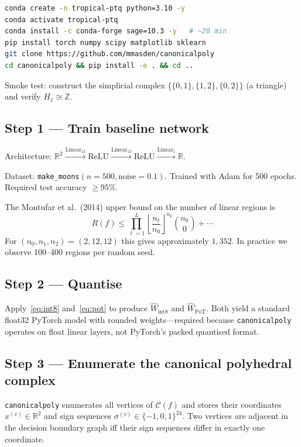 \documentclass[11pt]{article}
\newcommand{\R}{\mathbb{R}}
\newcommand{\Z}{\mathbb{Z}}
\newcommand{\C}{\mathcal{C}}
\begin{document}
\begin{lstlisting}[language=bash]
conda create -n tropical-ptq python=3.10 -y
conda activate tropical-ptq
conda install -c conda-forge sage=10.3 -y   # ~20 min
pip install torch numpy scipy matplotlib sklearn
git clone https://github.com/mmasden/canonicalpoly
cd canonicalpoly && pip install -e . && cd ..
\end{lstlisting}

Smoke test: construct the simplicial complex $\{\{0,1\},\{1,2\},\{0,2\}\}$
(a triangle) and verify $H_1 \cong \Z$.

\subsection{Step 1 — Train baseline network}

Architecture: $\R^2 \xrightarrow{\mathrm{Linear}_{12}} \mathrm{ReLU}
\xrightarrow{\mathrm{Linear}_{12}} \mathrm{ReLU}
\xrightarrow{\mathrm{Linear}_1} \R$.

Dataset: \texttt{make\_moons}$(n=500, \text{noise}=0.1)$. Trained with Adam for 500
epochs. Required test accuracy $\geq 95\%$.

The Montufar et al.\ (2014) upper bound on the number of linear regions is
\begin{equation}
R(f) \leq \prod_{\ell=1}^{L} \left\lfloor \frac{n_\ell}{n_0} \right\rfloor^{n_0}
\binom{n_0}{0} + \cdots
\end{equation}
For $(n_0, n_1, n_2) = (2, 12, 12)$ this gives approximately $1{,}352$. In practice
we observe 100--400 regions per random seed.

\subsection{Step 2 — Quantise}

Apply~\eqref{eq:int8} and~\eqref{eq:pot} to produce $\hat{W}_{\mathrm{int8}}$ and
$\hat{W}_{\mathrm{PoT}}$. Both yield a standard float32 PyTorch model with
rounded weights---required because \texttt{canonicalpoly} operates on float linear
layers, not PyTorch's packed quantised format.

\subsection{Step 3 — Enumerate the canonical polyhedral complex}

\texttt{canonicalpoly} enumerates all vertices of $\C(f)$ and stores their coordinates
$x^{(v)} \in \R^2$ and sign sequences $\sigma^{(v)} \in \{-1,0,1\}^{24}$.
Two vertices are adjacent in the decision boundary graph iff their sign sequences
differ in exactly one coordinate.
\end{document}
